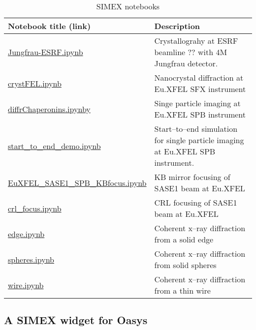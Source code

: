 \documentclass[10pt]{scrartcl}
\begin{document}
\begin{table}[ht]
  \centering
  \caption{SIMEX notebooks}
  \begin{tabular}{l|l}
    \hline
    \textbf{Notebook title} (link) & \textbf{Description} \\
    \hline
    \href{https://github.com/PaNOSC-ViNYL/SimEx-notebooks/blob/main/ESRF-SerialCrystallography/Jungfrau-ESRF.ipynb}{Jungfrau-ESRF.ipynb} & Crystallograhy at ESRF beamline ?? with 4M Jungfrau detector. \\
    \href{https://github.com/PaNOSC-ViNYL/SimEx-notebooks/blob/main/SFX/crystFEL.ipynb}{crystFEL.ipynb} &  Nanocrystal diffraction at Eu.XFEL SFX instrument \cite{White2012} \\
    \href{https://github.com/PaNOSC-ViNYL/SimEx-notebooks/blob/main/SPB/diffrChaperonins.ipynb}{diffrChaperonins.ipynby} & Singe particle imaging at Eu.XFEL SPB instrument\\
    \href{https://github.com/PaNOSC-ViNYL/SimEx-notebooks/blob/main/s2e/start_to_end_demo.ipynb}{start\_to\_end\_demo.ipynb} & Start--to--end simulation for single particle imaging at Eu.XFEL SPB instrument. \\
    \href{https://github.com/PaNOSC-ViNYL/wavefrontDB/blob/main/examples/EuXFEL_SASE1_SPB_KBfocus.ipynb}{EuXFEL\_SASE1\_SPB\_KBfocus.ipynb} & KB mirror focusing of SASE1 beam at Eu.XFEL \\
    \href{https://github.com/PaNOSC-ViNYL/wavefrontDB/blob/main/examples/crl_focus.ipynb}{crl\_focus.ipynb} & CRL focusing of SASE1 beam at Eu.XFEL \\
    \href{https://github.com/PaNOSC-ViNYL/wavefrontDB/blob/main/examples/edge.ipynb}{edge.ipynb} & Coherent x--ray diffraction from a solid edge \\
    \href{https://github.com/PaNOSC-ViNYL/wavefrontDB/blob/main/examples/spheres.ipynb}{spheres.ipynb} & Coherent x--ray diffraction from solid spheres \\
    \href{https://github.com/PaNOSC-ViNYL/wavefrontDB/blob/main/examples/wire.ipynb}{wire.ipynb} & Coherent x--ray diffraction from a thin wire \\
    \hline
  \end{tabular}
  \label{tab:simex-notebooks}
\end{table}

\subsection{A SIMEX widget for Oasys}
\label{sec:oasys-simex}
\end{document}
